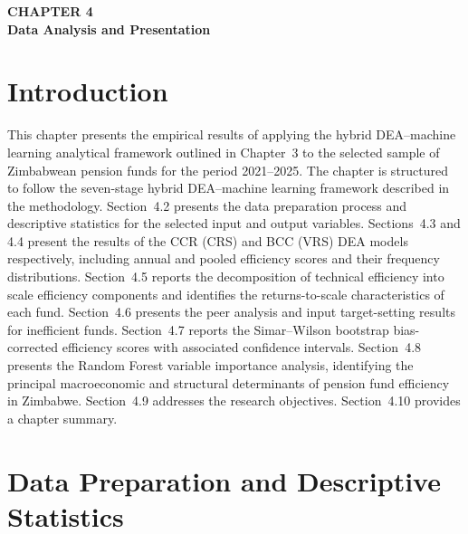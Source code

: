 \documentclass[12pt,a4paper]{article}
\begin{document}
\begin{center}
    {\LARGE\bfseries CHAPTER 4}\\[0.5cm]
    {\Large\bfseries Data Analysis and Presentation}
\end{center}
\setcounter{section}{0}
\renewcommand{\thesection}{4.\arabic{section}}
{}

\vspace{1cm}

\section{Introduction}

This chapter presents the empirical results of applying the hybrid DEA--machine learning analytical framework outlined in Chapter~3 to the selected sample of Zimbabwean pension funds for the period 2021--2025. The chapter is structured to follow the seven-stage hybrid DEA--machine learning framework described in the methodology. Section~4.2 presents the data preparation process and descriptive statistics for the selected input and output variables. Sections~4.3 and 4.4 present the results of the CCR (CRS) and BCC (VRS) DEA models respectively, including annual and pooled efficiency scores and their frequency distributions. Section~4.5 reports the decomposition of technical efficiency into scale efficiency components and identifies the returns-to-scale characteristics of each fund. Section~4.6 presents the peer analysis and input target-setting results for inefficient funds. Section~4.7 reports the Simar--Wilson bootstrap bias-corrected efficiency scores with associated confidence intervals. Section~4.8 presents the Random Forest variable importance analysis, identifying the principal macroeconomic and structural determinants of pension fund efficiency in Zimbabwe. Section~4.9 addresses the research objectives. Section~4.10 provides a chapter summary.

\section{Data Preparation and Descriptive Statistics}
\end{document}
